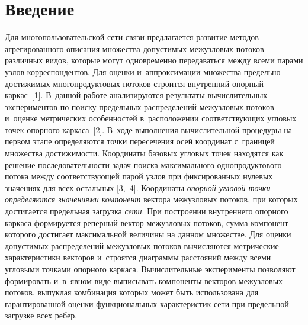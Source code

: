   



\thispagestyle{headings}

\begin{multicols}{2}

\label{st\stat}

\section{Введение}

Для   многопользовательской сети связи предлагается развитие
методов агрегированного описания множества до\-пус\-ти\-мых  межузловых
потоков различных видов,  которые  могут одновременно передаваться
между  всеми парами  уз\-лов-кор\-рес\-пон\-ден\-тов.  Для  оценки  
и~аппроксимации множества предельно достижимых многопродуктовых
потоков строится внут\-рен\-ний опорный каркас~[1].  В~данной работе
анализируются результаты вы\-чис\-ли\-тель\-ных экспериментов по  поиску
предельных распределений  межузловых потоков  и~оценке
мет\-ри\-че\-ских особенностей  в~расположении   со\-от\-вет\-ст\-ву\-ющих угловых
точек опорного каркаса~[2].  В~ходе выполнения вы\-чис\-ли\-тель\-ной
процедуры  на первом этапе  определяются   точ\-ки  пересечения осей
координат  с~границей множества до\-сти\-жи\-мости. Координаты базовых
угловых точек  находятся как решение  по\-сле\-до\-ва\-тель\-ности
задач поиска максимального однопродуктового      потока   меж\-ду
соответствующей   парой узлов  при фиксированных нулевых
значениях для всех остальных [3,~4]. Координаты \textit{опорной
угловой  точки определяются  значениями  компонент} вектора
межузловых потоков, при которых достигается предельная загрузка
\textit{сети}. При по\-стро\-ении внут\-рен\-не\-го опорного  каркаса
формируется  реперный вектор межузловых  потоков, сумма  компонент
которого  достигает максимальной величины на данном множестве.
Для  оценки допустимых распределений межузловых потоков
вы\-чис\-ля\-ют\-ся метрические характеристики векторов  и~строятся
диаграммы  рас\-сто\-яний между всеми угловыми точками опорного
каркаса. Вы\-чис\-ли\-тель\-ные эксперименты    поз\-во\-ля\-ют формировать  
и~в~явном виде    выписывать компоненты векторов  межузловых
потоков,  вы\-пук\-лая комбинация которых   может быть использована
для гарантированной оценки    функциональных характеристик сети
при предельной за\-груз\-ке всех ребер.



\end{multicols}
